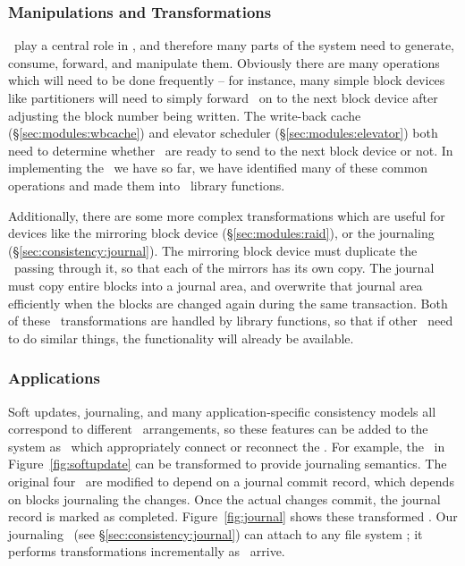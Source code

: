 \subsubsection {Manipulations and Transformations}
\Chdescs\ play a central role in \Kudos, and therefore many parts of the system
need to generate, consume, forward, and manipulate them. Obviously there are
many operations which will need to be done frequently -- for instance, many
simple block devices like partitioners will need to simply forward \chdescs\ on
to the next block device after adjusting the block number being written. The
write-back cache (\S\ref{sec:modules:wbcache}) and elevator scheduler
(\S\ref{sec:modules:elevator}) both need to determine whether \chdescs\ are
ready to send to the next block device or not. In implementing the \modules\ we
have so far, we have identified many of these common operations and made them
into \chdesc\ library functions.

Additionally, there are some more complex transformations which are useful for
devices like the mirroring block device (\S\ref{sec:modules:raid}), or the
journaling \module (\S\ref{sec:consistency:journal}). The mirroring block device
must duplicate the \chdescs\ passing through it, so that each of the mirrors has
its own copy. The journal must copy entire blocks into a journal area, and
overwrite that journal area efficiently when the blocks are changed again during
the same transaction. Both of these \chdesc\ transformations are handled by
library functions, so that if other \modules\ need to do similar things, the
functionality will already be available.

\subsubsection {Applications}
Soft updates, journaling, and many application-specific consistency models all
correspond to different \chdesc\ arrangements, so these features can be added to
the system as \modules\ which appropriately connect or reconnect the \chdescs.
For example, the \chdescs\ in Figure~\ref{fig:softupdate} can be transformed to
provide journaling semantics. The original four \chdescs\ are modified to depend
on a journal commit record, which depends on blocks journaling the changes. Once
the actual changes commit, the journal record is marked as completed.
Figure~\ref{fig:journal} shows these transformed \chdescs. Our journaling
\module\ (see \S\ref{sec:consistency:journal}) can attach to any file system
\module; it performs transformations incrementally as \chdescs\ arrive.


